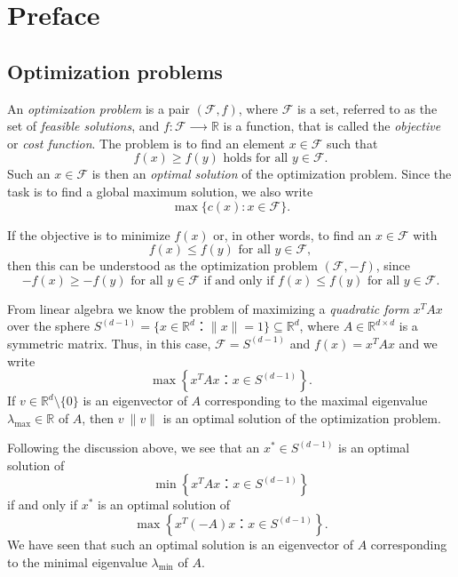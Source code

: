 
\chapter{Preface}
\label{cha:preface}


\section{Optimization problems}
\label{sec:optim-probl}

An \emph{optimization problem} is a pair $(ℱ,f)$, where $ℱ$ is a set, referred to as the set of \emph{feasible solutions},  and $f: ℱ ⟶ ℝ$ is a function, that is called the \emph{objective} or \emph{cost function}. The problem is to find an element $x ∈ ℱ$ such that
\begin{displaymath}
  f(x) ≥ f(y) \text{ holds for all } y ∈ ℱ. 
\end{displaymath}
Such an $x∈ ℱ$  is then an \emph{optimal solution} of the optimization problem.
Since the task is to find a global  maximum solution, we also write 
\begin{displaymath}
  \max \{ c(x) : x ∈ ℱ\}. 
\end{displaymath}

If the objective is to minimize $f(x)$ or, in other words, to find an $x ∈ ℱ$ with  
\begin{displaymath}
  f(x) ≤ f(y) \text{ for all } y ∈ ℱ,
\end{displaymath}
then this can be understood as the optimization problem $(ℱ,-f)$, since 
\begin{displaymath}
  -f(x) ≥ - f(y) \text{ for all } y ∈ ℱ \text{ if and only if }  f(x) ≤ f(y) \text{ for all } y ∈ ℱ. 
\end{displaymath}

\begin{example}
  \label{exe:1}
  From linear algebra we know the problem of maximizing  a
  \emph{quadratic form} $ x^T A x$ over the sphere
  $S^{(d-1)} = \{ x ∈ ℝ^d ： \|x\| = 1 \} ⊆ ℝ^d$, where $A ∈ ℝ^{d×d}$ is a symmetric
  matrix.  Thus, in this case,   $ℱ = S^{(d-1)}$ and $f(x) = x^T A x$ and we write
  \begin{displaymath}
    \max\left\{ x^T A x ： x ∈S^{(d-1)} \right\}. 
  \end{displaymath}
  If $v ∈ ℝ^d \setminus \{0\}$ is an eigenvector of $A$ corresponding to the
  maximal eigenvalue $λ_{\max} ∈ ℝ$ of $A$, then $v \ \|v\|$ is an optimal
  solution of the optimization problem.

  Following the discussion above, we see that an $x^* ∈ S^{(d-1)}$ is an optimal solution of
  \begin{displaymath}
    \min\left\{ x^T A x ： x ∈S^{(d-1)} \right\} 
  \end{displaymath}
  if and only if $x^*$ is an optimal solution of
   \begin{displaymath}
    \max\left\{ x^T (-A) x ： x ∈S^{(d-1)} \right\} . 
  \end{displaymath}
  We have seen that such an optimal solution is an eigenvector of $A$ corresponding to the minimal eigenvalue $λ_{\min}$ of $A$. 
\end{example}


